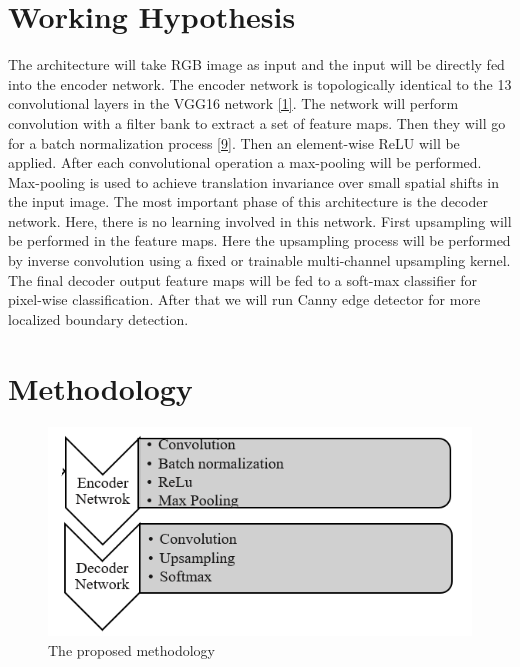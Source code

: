 \documentclass[a4paper,12pt]{article}
\begin{document}
\section{Working Hypothesis}
The architecture will take RGB image as input and the input will be directly fed into the encoder network. The encoder network is topologically identical to the 13 convolutional layers in the VGG16 network  \hyperlink{1}{[1]}. The network will perform convolution with a filter bank to extract a set of feature maps. Then they will go for a batch normalization process  \hyperlink{9}{[9]}. Then an element-wise ReLU will be applied. After each convolutional operation a max-pooling will be performed. Max-pooling is used to achieve translation invariance over small spatial shifts in the input image.
The most important phase of this architecture is the decoder network. Here, there is no learning involved in this network. First upsampling will be performed in the feature maps. Here the upsampling process will be performed by inverse convolution using a fixed or trainable multi-channel upsampling kernel. The final decoder output feature maps will be fed to a soft-max classifier for pixel-wise classification. After that we will run Canny edge detector for more localized boundary detection.

\clearpage

\section{Methodology}

\begin{figure}[h!]
\centering
\includegraphics[width=1.2\textwidth]{fig_1.png}
\caption{The proposed methodology}
\end{figure}
\end{document}
